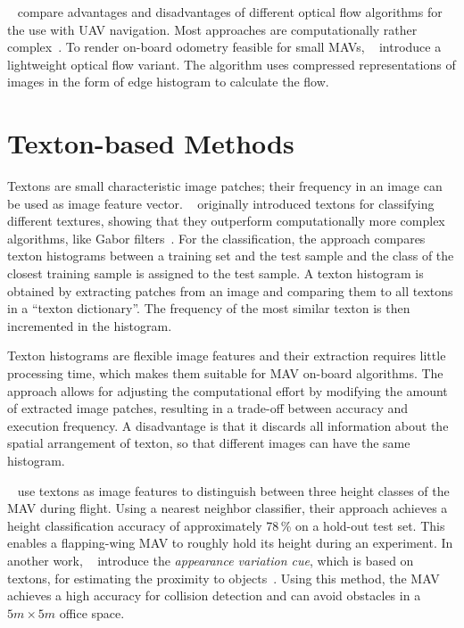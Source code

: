 \documentclass[11pt]{report}
\begin{document}
\citeauthor{chao2013survey}~\cite{chao2013survey} compare advantages
and disadvantages of different optical flow algorithms for the use
with UAV navigation. Most approaches are computationally rather
complex~\cite{mcguire2016local}. To render on-board odometry feasible
for small MAVs, \citeauthor{mcguire2016local}~\cite{mcguire2016local}
introduce a lightweight optical flow variant. The algorithm uses
compressed representations of images in the form of edge histogram to
calculate the flow.

\section{Texton-based Methods}
\label{sec:textonbasedapproaches}

Textons are small characteristic image patches; their frequency in an
image can be used as image feature
vector. \citeauthor{varma2005statistical}~\cite{varma2005statistical}
originally introduced textons for classifying different textures,
showing that they outperform computationally more complex algorithms,
like Gabor filters~\cite{varma2005statistical}. For the
classification, the approach compares texton histograms between a
training set and the test sample and the class of the closest training
sample is assigned to the test
sample. %
A texton histogram is obtained by extracting patches from an image and
comparing them to all textons in a ``texton dictionary''. The
frequency of the most similar texton is then incremented in the
histogram.

Texton histograms are flexible image features and their extraction
requires little processing time, which makes them suitable for MAV
on-board algorithms. The approach allows for adjusting the
computational effort by modifying the amount of extracted image
patches, resulting in a trade-off between accuracy and execution
frequency.  A disadvantage is that it discards all information about the spatial
arrangement of texton, %
so that different images can have the same histogram.

\citeauthor{de2009design}~\cite{de2009design} use textons
as image features to distinguish between three height classes of the
MAV during flight. Using a nearest neighbor classifier, their approach
achieves a height classification accuracy of approximately 78\,\% on a
hold-out test set. This enables a flapping-wing MAV to roughly hold
its height during an experiment. In another work,
\citeauthor{de2012appearance}~\cite{de2012appearance} introduce the
\emph{appearance variation cue}, which is based on textons, for
estimating the proximity to objects~\cite{de2012appearance}.
Using this method, the MAV achieves a high accuracy for collision
detection and can avoid obstacles in a $5m \times 5m$ office space.
\end{document}
